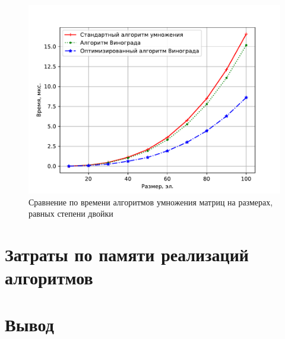 \begin{figure}[H]
	\centering
	\includegraphics[height=0.4\textheight, page=3]{img/figures.pdf}
	\caption{Сравнение по времени алгоритмов умножения матриц на размерах, равных степени двойки}
	\label{plt:time_03}
\end{figure}

\section{Затраты по памяти реализаций алгоритмов}

\section*{Вывод}
